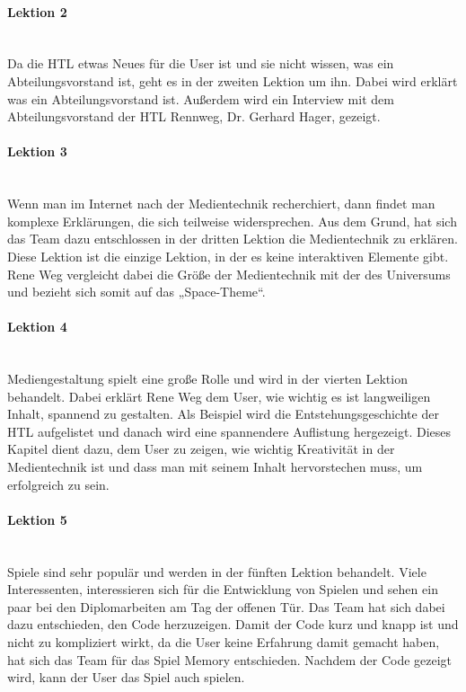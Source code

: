 \paragraph{Lektion 2}
\leavevmode \\
Da die HTL etwas Neues für die User ist und sie nicht wissen, was ein Abteilungsvorstand ist, geht es in der zweiten Lektion um ihn. Dabei wird erklärt was ein Abteilungsvorstand ist. Außerdem wird ein Interview mit dem Abteilungsvorstand der HTL Rennweg, Dr. Gerhard Hager, gezeigt. 

\paragraph{Lektion 3}
\leavevmode \\
Wenn man im Internet nach der Medientechnik recherchiert, dann findet man komplexe Erklärungen, die sich teilweise widersprechen. Aus dem Grund, hat sich das Team dazu entschlossen in der dritten Lektion die Medientechnik zu erklären. Diese Lektion ist die einzige Lektion, in der es keine interaktiven Elemente gibt. Rene Weg vergleicht dabei die Größe der Medientechnik mit der des Universums und bezieht sich somit auf das „Space-Theme“. 

\paragraph{Lektion 4}
\leavevmode \\
Mediengestaltung spielt eine große Rolle und wird in der vierten Lektion behandelt. Dabei erklärt Rene Weg dem User, wie wichtig es ist langweiligen Inhalt, spannend zu gestalten. Als Beispiel wird die Entstehungsgeschichte der HTL aufgelistet und danach wird eine spannendere Auflistung hergezeigt. Dieses Kapitel dient dazu, dem User zu zeigen, wie wichtig Kreativität in der Medientechnik ist und dass man mit seinem Inhalt hervorstechen muss, um erfolgreich zu sein.

\paragraph{Lektion 5}
\leavevmode \\
Spiele sind sehr populär und werden in der fünften Lektion behandelt. Viele Interessenten, interessieren sich für die Entwicklung von Spielen und sehen ein paar bei den Diplomarbeiten am Tag der offenen Tür. Das Team hat sich dabei dazu entschieden, den Code herzuzeigen. Damit der Code kurz und knapp ist und nicht zu kompliziert wirkt, da die User keine Erfahrung damit gemacht haben, hat sich das Team für das Spiel Memory entschieden. Nachdem der Code gezeigt wird, kann der User das Spiel auch spielen.

